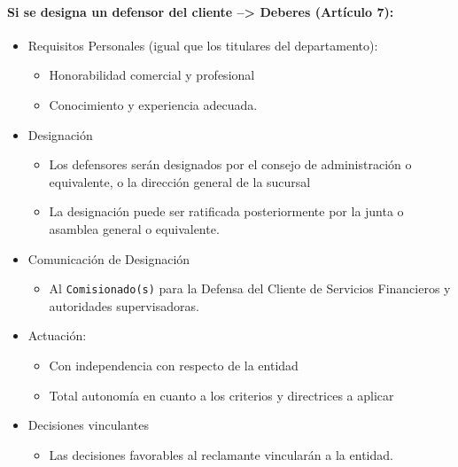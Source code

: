 \documentclass[
]{article}
\providecommand{\tightlist}{%
  \setlength{\itemsep}{0pt}\setlength{\parskip}{0pt}}
\begin{document}
\hypertarget{si-se-designa-un-defensor-del-cliente-deberes-artuxedculo-7}{%
\paragraph{\texorpdfstring{Si se designa un defensor del cliente
--\textgreater{} Deberes (\textbf{Artículo
7}):}{Si se designa un defensor del cliente --\textgreater{} Deberes (Artículo 7):}}\label{si-se-designa-un-defensor-del-cliente-deberes-artuxedculo-7}}

\begin{itemize}
\tightlist
\item
  Requisitos Personales (igual que los titulares del departamento):

  \begin{itemize}
  \tightlist
  \item
    Honorabilidad comercial y profesional
  \item
    Conocimiento y experiencia adecuada.
  \end{itemize}
\item
  Designación

  \begin{itemize}
  \tightlist
  \item
    Los defensores serán designados por el consejo de administración o
    equivalente, o la dirección general de la sucursal
  \item
    La designación puede ser ratificada posteriormente por la junta o
    asamblea general o equivalente.
  \end{itemize}
\item
  Comunicación de Designación

  \begin{itemize}
  \tightlist
  \item
    Al \texttt{Comisionado(s)} para la Defensa del Cliente de Servicios
    Financieros y autoridades supervisadoras.
  \end{itemize}
\item
  Actuación:

  \begin{itemize}
  \tightlist
  \item
    Con independencia con respecto de la entidad
  \item
    Total autonomía en cuanto a los criterios y directrices a aplicar
  \end{itemize}
\item
  Decisiones vinculantes

  \begin{itemize}
  \tightlist
  \item
    Las decisiones favorables al reclamante vincularán a la entidad.
  \end{itemize}
\end{itemize}
\end{document}
